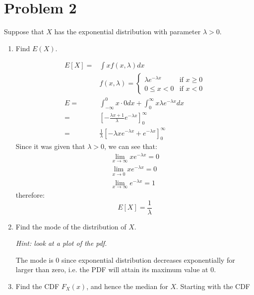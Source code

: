 \documentclass{article}
\newcommand{\1}{\mathbf{1}}
\begin{document}
\section*{Problem 2}
Suppose that $X$ has the exponential distribution with parameter $\lambda > 0$.
\begin{enumerate}
    \item Find $E(X)$.
    
    \begin{align*}
        E[X] = &\int xf(x,\lambda)dx \\
        & f(x, \lambda) = \begin{cases} 
	            \lambda e^{-\lambda x} &\mbox{if } x \geq 0 \\
	            0 \leq x < 0 &\mbox{if } x < 0
            \end{cases}  \\
        E = &\int_{-\infty}^0 x \cdot 0 dx + \int_0^\infty x \lambda e^{-\lambda x} dx \\
          = &\left[ -\frac{\lambda x + 1}{\lambda} e^{-\lambda x} \right]_0^\infty \\
          = &\frac{1}{\lambda} \left[ -\lambda x e^{-\lambda x} + e^{-\lambda x} \right]_0^\infty
    \end{align*}
    Since it was given that $\lambda>0$, we can see that:
    \begin{align*}
        \lim_{x\rightarrow\infty} x e^{-\lambda x}  = 0 \\
        \lim_{x\rightarrow 0} x e^{-\lambda x}  = 0 \\
        \lim_{x\rightarrow\infty} e^{-\lambda x}  = 1
    \end{align*}
    therefore:
    $$E[X] = \frac{1}{\lambda}$$
    
    \item Find the mode of the distribution of $X$.\par {\it Hint: look at a plot of the pdf.}
    
    The mode is 0 since exponential distribution decreases exponentially for larger than zero, i.e. the PDF will attain its maximum value at 0.
    
    \item Find the CDF $F_X(x)$, and hence the median for $X$. Starting with the CDF
    

\end{enumerate}
\end{document}
